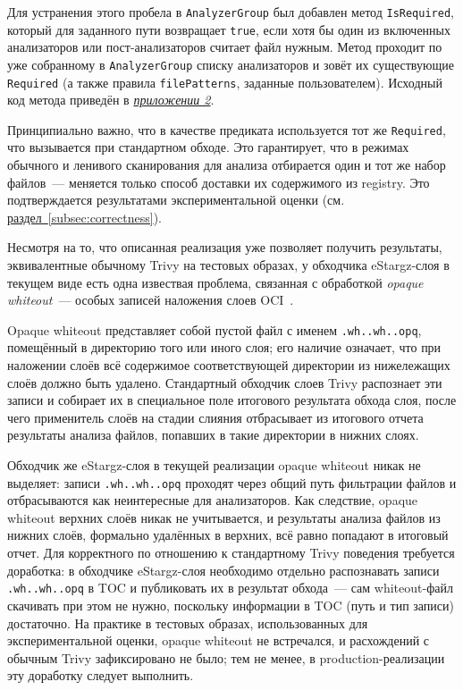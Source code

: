 Для устранения этого пробела в \texttt{AnalyzerGroup} был добавлен метод \texttt{IsRequired}, который для заданного пути возвращает \texttt{true}, если хотя бы один из включенных анализаторов или пост-анализаторов считает файл нужным. Метод проходит по уже собранному в \texttt{AnalyzerGroup} списку анализаторов и зовёт их существующие \texttt{Required} (а также правила \texttt{filePatterns}, заданные пользователем). Исходный код метода приведён в \hyperref[app:isrequired]{\textit{приложении 2}}.

Принципиально важно, что в качестве предиката используется тот же \texttt{Required}, что вызывается при стандартном обходе. Это гарантирует, что в режимах обычного и ленивого сканирования для анализа отбирается один и тот же набор файлов~--- меняется только способ доставки их содержимого из registry. Это подтверждается результатами экспериментальной оценки (см. \hyperref[subsec:correctness]{раздел~\ref{subsec:correctness}}).

Несмотря на то, что описанная реализация уже позволяет получить результаты, эквивалентные обычному Trivy на тестовых образах, у обходчика eStargz-слоя в текущем виде есть одна извествая проблема, связанная с обработкой \textit{opaque whiteout}~--- особых записей наложения слоев OCI~\cite{oci}.

Opaque whiteout представляет собой пустой файл с именем \texttt{.wh..wh..opq}, помещённый в директорию того или иного слоя; его наличие означает, что при наложении слоёв всё содержимое соответствующей директории из нижележащих слоёв должно быть удалено. Стандартный обходчик слоев Trivy распознает эти записи и собирает их в специальное поле итогового результата обхода слоя, после чего применитель слоёв на стадии слияния отбрасывает из итогового отчета результаты анализа файлов, попавших в такие директории в нижних слоях.

Обходчик же eStargz-слоя в текущей реализации opaque whiteout никак не выделяет: записи \texttt{.wh..wh..opq} проходят через общий путь фильтрации файлов и отбрасываются как неинтересные для анализаторов. Как следствие, opaque whiteout верхних слоёв никак не учитывается, и результаты анализа файлов из нижних слоёв, формально удалённых в верхних, всё равно попадают в итоговый отчет. Для корректного по отношению к стандартному Trivy поведения требуется доработка: в обходчике eStargz-слоя необходимо отдельно распознавать записи \texttt{.wh..wh..opq} в TOC и публиковать их в результат обхода~--- сам whiteout-файл скачивать при этом не нужно, поскольку информации в TOC (путь и тип записи) достаточно. На практике в тестовых образах, использованных для экспериментальной оценки, opaque whiteout не встречался, и расхождений с обычным Trivy зафиксировано не было; тем не менее, в production-реализации эту доработку следует выполнить.

